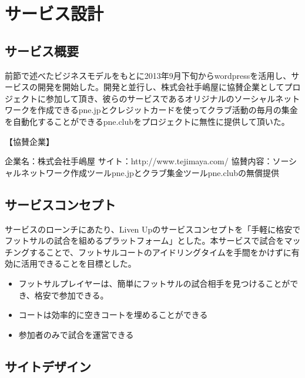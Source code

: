 \chapter{サービス設計}

\section{サービス概要}
前節で述べたビジネスモデルをもとに2013年9月下旬からwordpressを活用し、サービスの開発を開始した。開発と並行し、株式会社手嶋屋に協賛企業としてプロジェクトに参加して頂き、彼らのサービスであるオリジナルのソーシャルネットワークを作成できるpne.jpとクレジットカードを使ってクラブ活動の毎月の集金を自動化することができるpne.clubをプロジェクトに無性に提供して頂いた。

【協賛企業】

企業名：株式会社手嶋屋
サイト：http://www.tejimaya.com/
協賛内容：ソーシャルネットワーク作成ツールpne.jpとクラブ集金ツールpne.clubの無償提供
\section{サービスコンセプト}
サービスのローンチにあたり、Liven Upのサービスコンセプトを「手軽に格安でフットサルの試合を組めるプラットフォーム」とした。本サービスで試合をマッチングすることで、フットサルコートのアイドリングタイムを手間をかけずに有効に活用できることを目標とした。

\begin{itemize}
	\item フットサルプレイヤーは、簡単にフットサルの試合相手を見つけることができ、格安で参加できる。
	\item コートは効率的に空きコートを埋めることができる
	\item 参加者のみで試合を運営できる
\end{itemize}
\section{サイトデザイン}
